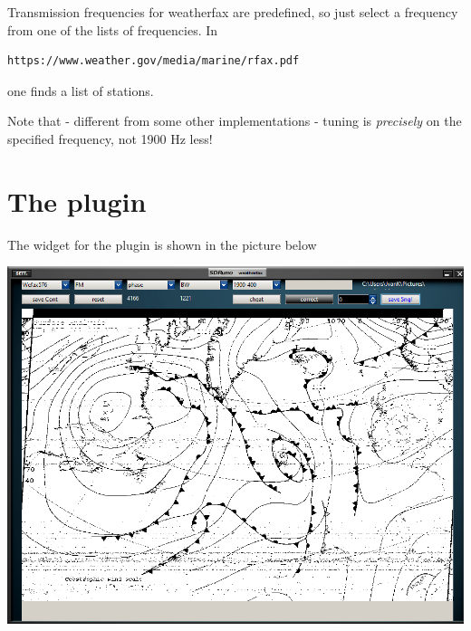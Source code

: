 \documentclass[11pt]{article}
\begin{document}
Transmission frequencies for weatherfax are predefined, so just select
a frequency from one of the lists of frequencies.
In 
\begin{verbatim}
https://www.weather.gov/media/marine/rfax.pdf
\end{verbatim}
one finds a list of stations.
\par
Note that - different from some other implementations - tuning is
{\em precisely} on the specified frequency, not 1900 Hz less!
\section{The plugin}
The widget for the plugin is shown in the picture below

\includegraphics[width=140mm]{wfax-example-2.png}
\end{document}
